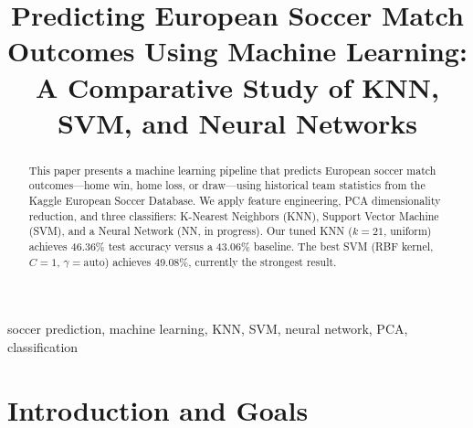 \documentclass[conference]{IEEEtran}
\begin{document}
\title{Predicting European Soccer Match Outcomes Using Machine Learning:
A Comparative Study of KNN, SVM, and Neural Networks}

\author{
  \and
  \and
}

\maketitle

\begin{abstract}
This paper presents a machine learning pipeline that predicts European soccer match outcomes---home win, home loss, or draw---using historical team statistics from the Kaggle European Soccer Database. We apply feature engineering, PCA dimensionality reduction, and three classifiers: K-Nearest Neighbors (KNN), Support Vector Machine (SVM), and a Neural Network (NN, in progress). Our tuned KNN ($k=21$, uniform) achieves 46.36\% test accuracy versus a 43.06\% baseline. The best SVM (RBF kernel, $C=1$, $\gamma=\text{auto}$) achieves 49.08\%, currently the strongest result.
\end{abstract}

\begin{IEEEkeywords}
soccer prediction, machine learning, KNN, SVM, neural network, PCA, classification
\end{IEEEkeywords}

\section{Introduction and Goals}
\end{document}
